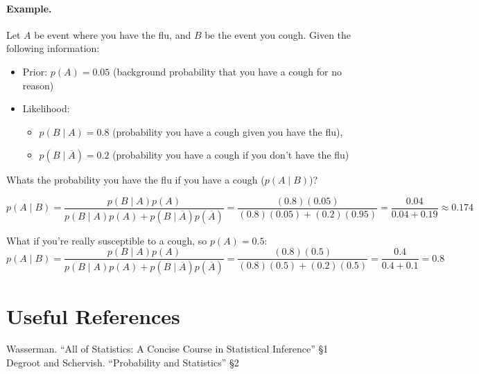 \paragraph{Example.} 
Let $A$ be event where you have the flu, and $B$ be the event you cough. 
Given the following information: 
\begin{itemize}
\item[] Prior: $p(A)=0.05$ (background probability that you have a cough for no reason)
\item[] Likelihood:
\begin{itemize} 
\item $p(B\mid A) = 0.8$ (probability you have a cough given you have the flu), 
\item $p(B\mid \overline A) = 0.2$ (probability you have a cough if you don't have the flu)
\end{itemize}
\end{itemize}
Whats the probability you have the flu if you have a cough ($p(A\mid B)$)?

\[p(A\mid B) = \frac{p(B\mid A)p(A)}{p(B\mid A)p(A) + p(B\mid \overline A)p(\overline A)} = \frac{(0.8)(0.05)}{(0.8)(0.05)+(0.2)(0.95)}=\frac{0.04}{0.04+0.19}\approx 0.174\]

What if you're really susceptible to a cough, so $p(A)=0.5$:
\[p(A\mid B) = \frac{p(B\mid A)p(A)}{p(B\mid A)p(A) + p(B\mid \overline A)p(\overline A)} = \frac{(0.8)(0.5)}{(0.8)(0.5)+(0.2)(0.5)}=\frac{0.4}{0.4+0.1}=0.8\]

\section*{Useful References}
Wasserman. ``All of Statistics: A Concise Course in Statistical Inference'' \S 1 
Degroot and Schervish. ``Probability and Statistics'' \S 2

